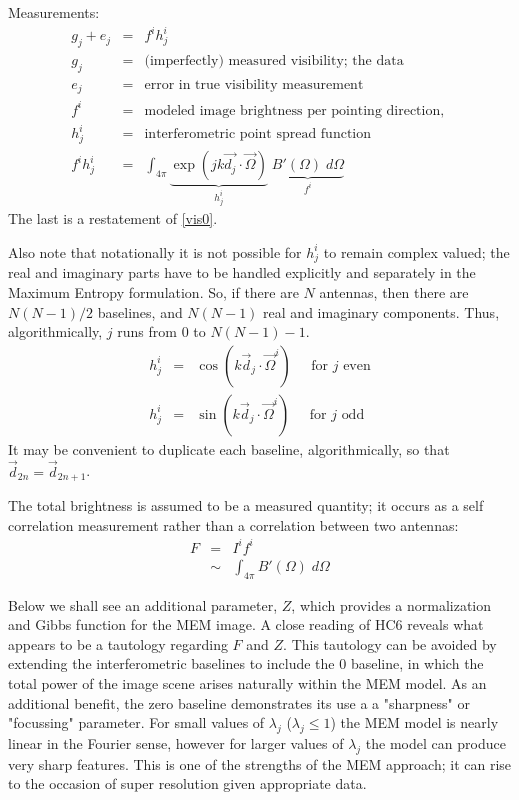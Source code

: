 \documentclass[12pt]{book}
\begin{document}
Measurements:
\begin{eqnarray}
g_j + e_j &=& f^i h^i_j \\
g_j         &=& \textrm{(imperfectly) measured visibility; the data} \\
e_j         &=& \textrm{error in true visibility measurement} \\
f^i           &=& \textrm{modeled image brightness per pointing direction, } \\
h^i_j      &=& \textrm{interferometric point spread function} \\
f^i h^i_j &=& \int_{4\pi} 
\underbrace{ \exp(j k \vec{d_j}\cdot \vec{\Omega}) }_{h^i_j}\; \underbrace{B'(\Omega) \; d\Omega}_{f^i} 
\end{eqnarray}
The last is a restatement of \eqref{vis0}.

Also note that notationally it is not possible for $h^i_j$ to remain complex valued; the real and imaginary 
parts have to be handled explicitly and separately in the Maximum Entropy formulation.  So, if there are 
$N$ antennas, then there are $N(N-1)/2$ baselines, and $N(N-1)$ real and imaginary components.  Thus,
algorithmically, $j$ runs from $0$ to $N(N-1) -1$.
\begin{eqnarray}
h_j^i &=& \cos(k\vec{d}_j \cdot \vec{\Omega}^i ) \;\;\;\;\; \textrm{for } j \textrm{ even} \\ 
h_j^i &=& \sin(k\vec{d}_j \cdot \vec{\Omega}^i) \;\;\;\;\; \textrm{for } j \textrm{ odd}  
\end{eqnarray}
It may be convenient to duplicate each baseline, algorithmically, so that $\vec{d}_{2n} = \vec{d}_{2n+1}$.

The total brightness is assumed to be a measured quantity; it occurs as a self correlation measurement rather
than a correlation between two antennas:
\begin{eqnarray}
F   &=& I^i f^i \\
     &\sim&  \int_{4\pi} B'(\Omega) \; d\Omega
\end{eqnarray}

Below we shall see an additional parameter, $Z$, which provides a normalization and Gibbs function for the MEM 
image.  A close reading of HC6 reveals what appears to be a tautology regarding $F$ and $Z$.  This tautology 
can be avoided by extending the interferometric baselines to include the $0$ baseline, in which the total power of 
the image scene arises naturally within the MEM model.  As an additional benefit, the zero 
baseline demonstrates its use a a "sharpness" or "focussing" parameter.   For small values of $\lambda_j$ ($
\lambda_j \le 1$) the MEM model is nearly linear in the Fourier sense, however for larger values of $\lambda_j$ 
the model can produce very sharp features.  This is one of the strengths of the MEM approach; it can rise to the 
occasion of super resolution given appropriate data.
\end{document}
